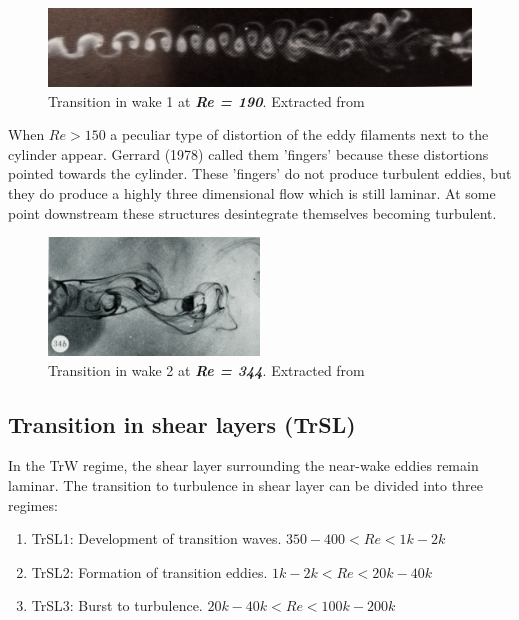 \documentclass[journal]{new-aiaa}
\begin{document}
\begin{figure}[H]
\begin{center}
\includegraphics[width=1\textwidth]{Images/federico/Figure03}
\caption{Transition in wake 1 at \textbf{\textit{Re = 190}}. Extracted from \cite{Zdravkovich1968} }
\label{fig:TrW1}
\end{center}
\end{figure}

When $Re>150$ a peculiar type of distortion of the eddy filaments next to the cylinder appear. Gerrard (1978) \cite{Gerrard1978} called them 'fingers' because these distortions pointed towards the cylinder. These 'fingers' do not produce turbulent eddies, but they do produce a highly three dimensional flow which is still laminar. At some point downstream these structures desintegrate themselves becoming turbulent.


\begin{figure}[H]
\begin{center}
\includegraphics[width=0.5\textwidth]{Images/federico/Figure04}
\caption{Transition in wake 2 at \textbf{\textit{Re = 344}}. Extracted from \cite{Gerrard1978} }
\label{fig:TrW2}
\end{center}
\end{figure}

\subsection{Transition in shear layers (TrSL)}

In the TrW regime, the shear layer surrounding the near-wake eddies remain laminar. The transition to turbulence in shear layer can be divided into three regimes:

\begin{enumerate}[label=(\roman*)]
\item TrSL1: Development of transition waves. $350-400<Re<1k-2k$
\item TrSL2: Formation of transition eddies. $1k-2k<Re<20k-40k$
\item TrSL3: Burst to turbulence. $20k-40k<Re<100k-200k$
\end{enumerate}
\end{document}
